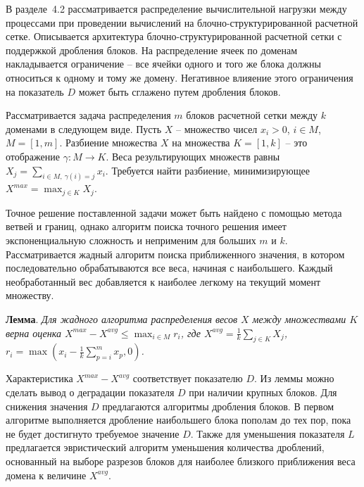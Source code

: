\documentclass[a4paper,14pt]{extarticle}                     %
\theoremstyle{plain}                                         %
\begin{document}

В разделе~4.2 рассматривается распределение вычислительной нагрузки между процессами при проведении вычислений на блочно-структурированной расчетной сетке.
Описывается архитектура блочно-структурированной расчетной сетки с поддержкой дробления блоков.
На распределение ячеек по доменам накладывается ограничение -- все ячейки одного и того же блока должны относиться к одному и тому же домену.
Негативное влияение этого ограничения на показатель $D$ может быть сглажено путем дробления блоков.

Рассматривается задача распределения $m$ блоков расчетной сетки между $k$ доменами в следующем виде.
Пусть $X$ -- множество чисел $x_i > 0$, $i \in M$, $M = [1, m]$.
Разбиение множества $X$ на множества $K = [1, k]$ -- это отображение $\gamma: M \rightarrow K$.
Веса результирующих множеств равны $X_j = \sum_{i \in M, \ \gamma(i) = j}{x_i}$.
Требуется найти разбиение, минимизирующее $X^{max} = \max_{j \in K}{X_j}$.

Точное решение поставленной задачи может быть найдено с помощью метода ветвей и границ, однако алгоритм поиска точного решения имеет экспоненциальную сложность и неприменим для больших $m$ и $k$.
Рассматривается жадный алгоритм поиска приближенного значения, в котором последовательно обрабатываются все веса, начиная с наибольшего.
Каждый необработанный вес добавляется к наиболее легкому на текущий момент множеству.

\textbf{Лемма}. \textit{Для жадного алгоритма распределения весов $X$ между множествами $K$ верна оценка $X^{max} - X^{avg} \le \max_{i \in M}{r_i}$, где $X^{avg} = \frac{1}{k}\sum_{j \in K}{X_j}$, $r_i = \max{( x_i - \frac{1}{k} \sum_{p = i}^{m}{x_p}, 0)}$.}

Характеристика $X^{max} - X^{avg}$ соответствует показателю $D$.
Из леммы можно сделать вывод о деградации показателя $D$ при наличии крупных блоков.
Для снижения значения $D$ предлагаются алгоритмы дробления блоков.
В первом алгоритме выполняется дробление наибольшего блока пополам до тех пор, пока не будет достигнуто требуемое значение $D$.
Также для уменьшения показателя $L$ предлагается эвристический алгоритм уменьшения количества дроблений, основанный на выборе разрезов блоков для наиболее близкого приближения веса домена к величине $X^{avg}$.
\end{document}
